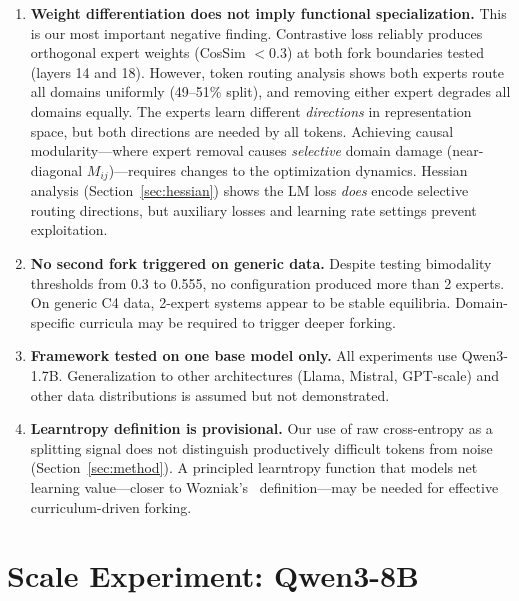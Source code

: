 \documentclass{article}
\begin{document}
\begin{enumerate}
    \item \textbf{Weight differentiation does not imply functional
          specialization.} This is our most important negative finding.
          Contrastive loss reliably produces orthogonal expert weights
          (CosSim $<$0.3) at both fork boundaries tested (layers 14 and 18).
          However, token routing analysis shows both experts route all domains
          uniformly (49--51\% split), and removing either expert degrades all
          domains equally. The experts learn different \emph{directions} in
          representation space, but both directions are needed by all tokens.
          Achieving causal modularity---where expert removal causes
          \emph{selective} domain damage (near-diagonal $M_{ij}$)---requires
          changes to the optimization dynamics. Hessian analysis
          (Section~\ref{sec:hessian}) shows the LM loss \emph{does} encode
          selective routing directions, but auxiliary losses and learning rate
          settings prevent exploitation.
    \item \textbf{No second fork triggered on generic data.} Despite testing
          bimodality thresholds from 0.3 to 0.555, no configuration produced
          more than 2 experts. On generic C4 data, 2-expert systems appear to
          be stable equilibria. Domain-specific curricula may be required to
          trigger deeper forking.
    \item \textbf{Framework tested on one base model only.} All experiments use
          Qwen3-1.7B. Generalization to other architectures (Llama, Mistral,
          GPT-scale) and other data distributions is assumed but not
          demonstrated.
    \item \textbf{Learntropy definition is provisional.} Our use of raw
          cross-entropy as a splitting signal does not distinguish productively
          difficult tokens from noise (Section~\ref{sec:method}). A principled
          learntropy function that models net learning value---closer to
          Wozniak's~\cite{wozniak2018learntropy} definition---may be needed
          for effective curriculum-driven forking.
\end{enumerate}

\section{Scale Experiment: Qwen3-8B}
\label{sec:8b}
\end{document}
